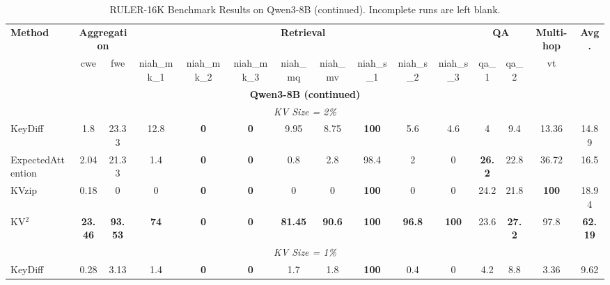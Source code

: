 \documentclass[11pt]{article}
\begin{document}
\begin{table}[htbp]
\centering
\caption{RULER-16K Benchmark Results on Qwen3-8B (continued). Incomplete runs are left blank.}
\label{tab:ruler_16k_results_continued}
\small
\setlength{\tabcolsep}{4pt}
\renewcommand{\arraystretch}{1.2}

\begin{tabular}{l|cc|cccccccc|cc|c|c}
\toprule
\multirow{2}{*}{\textbf{Method}}
    & \multicolumn{2}{c|}{\textbf{Aggregation}}
    & \multicolumn{8}{c|}{\textbf{Retrieval}}
    & \multicolumn{2}{c|}{\textbf{QA}}
    & \textbf{Multi-hop}
    & \multirow{2}{*}{\textbf{Avg.}} \\
\cmidrule(lr){2-3} \cmidrule(lr){4-11} \cmidrule(lr){12-13} \cmidrule(lr){14-14}
    & cwe & fwe
    & niah\_mk\_1 & niah\_mk\_2 & niah\_mk\_3
    & niah\_mq & niah\_mv
    & niah\_s\_1 & niah\_s\_2 & niah\_s\_3
    & qa\_1 & qa\_2
    & vt
    & \\
\midrule

\multicolumn{15}{c}{\textbf{Qwen3-8B (continued)}} \\
\midrule

\midrule
\multicolumn{15}{c}{\textit{KV Size = 2\%}} \\
\midrule

KeyDiff
    & 1.8 & 23.33
    & 12.8 & \textbf{0} & \textbf{0}
    & 9.95 & 8.75
    & \textbf{100} & 5.6 & 4.6
    & 4 & 9.4
    & 13.36
    & 14.89 \\

ExpectedAttention
    & 2.04 & 21.33
    & 1.4 & \textbf{0} & \textbf{0}
    & 0.8 & 2.8
    & 98.4 & 2 & 0
    & \textbf{26.2} & 22.8
    & 36.72
    & 16.5 \\

KVzip
    & 0.18 & 0
    & 0 & \textbf{0} & \textbf{0}
    & 0 & 0
    & \textbf{100} & 0 & 0
    & 24.2 & 21.8
    & \textbf{100}
    & 18.94 \\

KV$^2$
    & \textbf{23.46} & \textbf{93.53}
    & \textbf{74} & \textbf{0} & \textbf{0}
    & \textbf{81.45} & \textbf{90.6}
    & \textbf{100} & \textbf{96.8} & \textbf{100}
    & 23.6 & \textbf{27.2}
    & 97.8
    & \textbf{62.19} \\

\midrule
\multicolumn{15}{c}{\textit{KV Size = 1\%}} \\
\midrule

KeyDiff
    & 0.28 & 3.13
    & 1.4 & \textbf{0} & \textbf{0}
    & 1.7 & 1.8
    & \textbf{100} & 0.4 & 0
    & 4.2 & 8.8
    & 3.36
    & 9.62 \\


\end{tabular}
\end{table}
\end{document}
